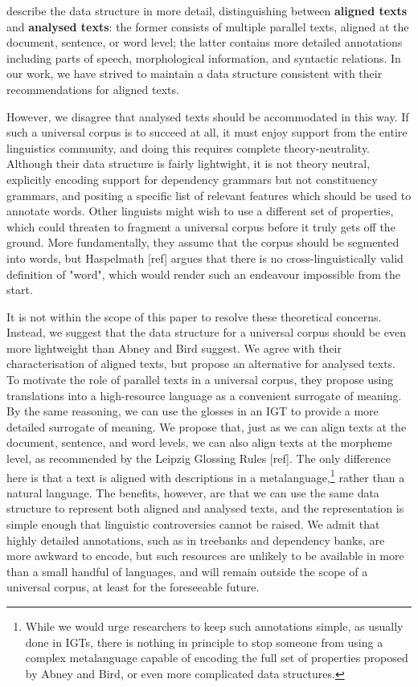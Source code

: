 \documentclass[11pt]{article}
\begin{document}
 describe the data structure in more detail, distinguishing between \textbf{aligned texts} and \textbf{analysed texts}: the former consists of multiple parallel texts, aligned at the document, sentence, or word level; the latter contains more detailed annotations including parts of speech, morphological information, and syntactic relations. In our work, we have strived to maintain a data structure consistent with their recommendations for aligned texts.

However, we disagree that analysed texts should be accommodated in this way. If such a universal corpus is to succeed at all, it must enjoy support from the entire linguistics community, and doing this requires complete theory-neutrality. Although their data structure is fairly lightwight, it is not theory neutral, explicitly encoding support for dependency grammars but not constituency grammars, and positing a specific list of relevant features which should be used to annotate words. Other linguists might wish to use a different set of properties, which could threaten to fragment a universal corpus before it truly gets off the ground. More fundamentally, they assume that the corpus should be segmented into words, but Haspelmath [ref] argues that there is no cross-linguistically valid definition of "word", which would render such an endeavour impossible from the start.

It is not within the scope of this paper to resolve these theoretical concerns. Instead, we suggest that the data structure for a universal corpus should be even more lightweight than Abney and Bird suggest. We agree with their characterisation of aligned texts, but propose an alternative for analysed texts. To motivate the role of parallel texts in a universal corpus, they propose using translations into a high-resource language as a convenient surrogate of meaning. By the same reasoning, we can use the glosses in an IGT to provide a more detailed surrogate of meaning. We propose that, just as we can align texts at the document, sentence, and word levels, we can also align texts at the morpheme level, as recommended by the Leipzig Glossing Rules [ref]. The only difference here is that a text is aligned with descriptions in a metalanguage,\footnote{While we would urge researchers to keep such annotations simple, as usually done in IGTs, there is nothing in principle to stop someone from using a complex metalanguage capable of encoding the full set of properties proposed by Abney and Bird, or even more complicated data structures.} rather than a natural language. The benefits, however, are that we can use the same data structure to represent both aligned and analysed texts, and the representation is simple enough that linguistic controversies cannot be raised. We admit that highly detailed annotations, such as in treebanks and dependency banks, are more awkward to encode, but such resources are unlikely to be available in more than a small handful of languages, and will remain outside the scope of a universal corpus, at least for the foreseeable future.
\end{document}
